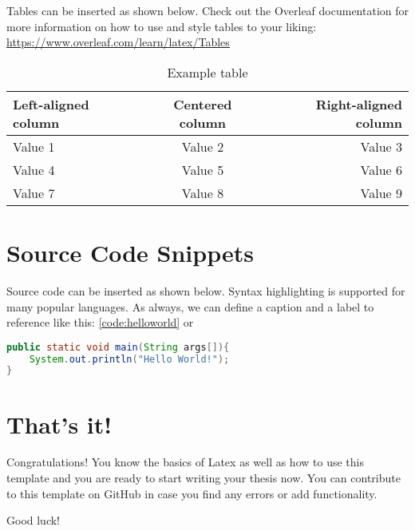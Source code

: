 Tables can be inserted as shown below. Check out the Overleaf documentation for more information on how to use and style tables to your liking: \url{https://www.overleaf.com/learn/latex/Tables}

\begin{table}[ht]   %
    \centering
    \footnotesize
    \begin{tabular}{lcr} %
        \toprule    %
        Left-aligned column  & Centered column  & Right-aligned column \\
        \midrule    %
        Value 1 & Value 2 & Value 3 \\
        Value 4 & Value 5 & Value 6 \\
        Value 7 & Value 8 & Value 9 \\
        \bottomrule %
    \end{tabular}
    \caption{Example table}
    \label{table:example_table}
\end{table}


\section{Source Code Snippets}
Source code can be inserted as shown below. Syntax highlighting is supported for many popular languages. As always, we can define a caption and a label to reference like this: \cref{code:helloworld} or 

\begin{lstlisting}[language=Java, caption=Hello World in Java, label=code:helloworld]
public static void main(String args[]){
    System.out.println("Hello World!");
}
\end{lstlisting}


\section{That's it!}
Congratulations! You know the basics of Latex as well as how to use this template and you are ready to start writing your thesis now. You can contribute to this template on GitHub in case you find any errors or add functionality.\par

Good luck!

\cite{oneil_star_2009}